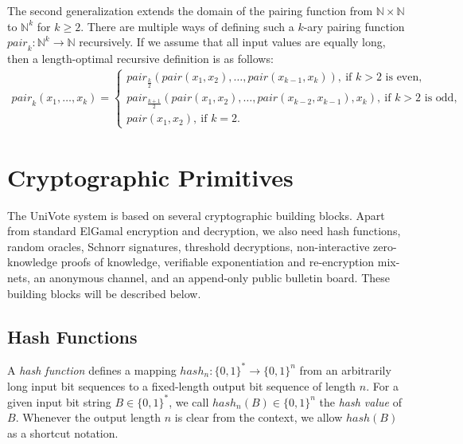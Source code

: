 \documentclass[bibtotoc,halfparskip,oneside]{scrreprt}
\begin{document}
	The second generalization extends the domain of the pairing function from $\mathbb{N}\times\mathbb{N}$ to $\mathbb{N}^k$ for $k\geq 2$. There are multiple ways of defining such a $k$-ary pairing function $\mathit{pair}_k:\mathbb{N}^k\rightarrow \mathbb{N}$ recursively. If we assume that all input values are equally long, then a length-optimal recursive definition is as follows:
	\begin{align}
		\mathit{pair}_k(x_1,\ldots,x_k) = \begin{cases}
			\mathit{pair}_{\frac{k}{2}}(\mathit{pair}(x_1,x_2),\ldots,\mathit{pair}(x_{k-1},x_k)),~\text{if $k>2$ is even},\\
			\mathit{pair}_{\frac{k+1}{2}}(\mathit{pair}(x_1,x_2),\ldots,\mathit{pair}(x_{k-2},x_{k-1}),x_k),~\text{if $k>2$ is odd},\\
			\mathit{pair}(x_1,x_2),~\text{if $k=2$}.			
		\end{cases}
	\end{align}
	
	\chapter{Cryptographic Primitives}
	
	The UniVote system is based on several cryptographic building blocks. Apart from standard ElGamal encryption and decryption, we also need hash functions, random oracles, Schnorr signatures, threshold decryptions, non-interactive zero-knowledge proofs of knowledge, verifiable exponentiation and re-encryption mix-nets, an anonymous channel, and an append-only public bulletin board. These building blocks will be described below.
	
	\section{Hash Functions} 
	
	A \emph{hash function} defines a mapping $\mathit{hash}_n:\{0,1\}^*\rightarrow\{0,1\}^n$ from an arbitrarily long input bit sequences to a fixed-length output bit sequence of length $n$. For a given input bit string $B\in\{0,1\}^*$, we call $\mathit{hash}_n(B)\in\{0,1\}^n$ the \emph{hash value} of $B$. Whenever the output length $n$ is clear from the context, we allow $\mathit{hash}(B)$ as a shortcut notation.
	
\end{document}
